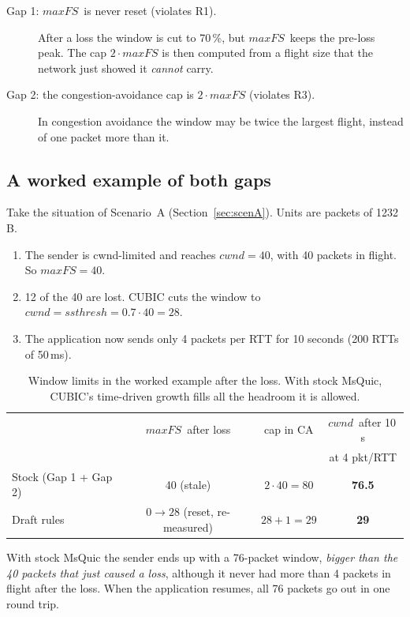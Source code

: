 \documentclass[11pt,a4paper]{article}
\newcommand{\maxfs}{\ensuremath{\mathit{maxFS}}}
\newcommand{\cwnd}{\ensuremath{\mathit{cwnd}}}
\newcommand{\ssthresh}{\ensuremath{\mathit{ssthresh}}}
\begin{document}
\begin{description}
  \item[Gap 1: \maxfs\ is never reset (violates R1).] After a loss the window
        is cut to 70\,\%, but \maxfs\ keeps the pre-loss peak. The cap
        $2\cdot\maxfs$ is then computed from a flight size that the network
        just showed it \emph{cannot} carry.
  \item[Gap 2: the congestion-avoidance cap is $2\cdot\maxfs$ (violates R3).]
        In congestion avoidance the window may be twice the largest flight,
        instead of one packet more than it.
\end{description}

\subsection{A worked example of both gaps}
\label{sec:worked}

Take the situation of Scenario~A (Section~\ref{sec:scenA}). Units are
packets of 1232\,B.
\begin{enumerate}
  \item The sender is cwnd-limited and reaches $\cwnd = 40$, with 40 packets
        in flight. So $\maxfs = 40$.
  \item 12 of the 40 are lost. CUBIC cuts the window to
        $\cwnd = \ssthresh = 0.7\cdot 40 = 28$.
  \item The application now sends only 4 packets per RTT for 10 seconds
        (200 RTTs of 50\,ms).
\end{enumerate}

\begin{table}[ht]
\centering
\caption{Window limits in the worked example after the loss. With stock
  MsQuic, CUBIC's time-driven growth fills all the headroom it is allowed.}
\label{tab:worked}
\begin{tabular}{@{}lccc@{}}
\toprule
 & \maxfs\ after loss & cap in CA & \cwnd\ after 10\,s \\
 & & & at 4 pkt/RTT \\
\midrule
Stock (Gap 1 + Gap 2) & 40 (stale) & $2\cdot 40 = 80$ & \textbf{76.5} \\
Draft rules & $0\to 28$ (reset, re-measured) & $28 + 1 = 29$ & \textbf{29} \\
\bottomrule
\end{tabular}
\end{table}

With stock MsQuic the sender ends up with a 76-packet window, \emph{bigger
than the 40 packets that just caused a loss}, although it never had more
than 4 packets in flight after the loss. When the application resumes, all
76 packets go out in one round trip.
\end{document}
